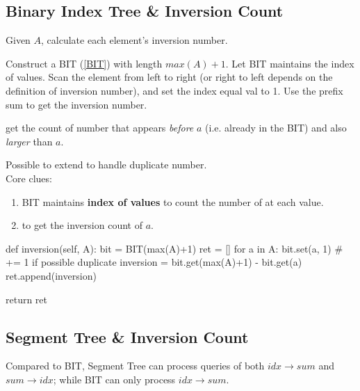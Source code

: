 \subsection{Binary Index Tree \& Inversion Count}
Given $A$, calculate each element's inversion number. 

Construct a BIT (\ref{BIT}) with length $max(A)+1$. Let BIT maintains the index of values. Scan the element from left to right (or right to left depends on the definition of inversion number), and set the index equal val to 1. Use the prefix sum to get the inversion number.

 get the count of number that appears \textit{before} $a$ (i.e. already in the BIT) and also \textit{larger} than $a$. 

Possible to extend to handle duplicate number. 
\\
Core clues:
\begin{enumerate}
\item BIT maintains \textbf{index of values} to count the number of at each value.
\item {} to get the inversion count of $a$.
\end{enumerate}
\begin{python}
def inversion(self, A):
    bit = BIT(max(A)+1)
    ret = []
    for a in A:
        bit.set(a, 1)  # += 1 if possible duplicate 
        inversion = bit.get(max(A)+1) - bit.get(a)
        ret.append(inversion)

    return ret
\end{python}

\subsection{Segment Tree \& Inversion Count}\label{segmentTreeInversionCount}
Compared to BIT, Segment Tree can process queries of both $idx \rightarrow sum$ and $sum \rightarrow idx$; while BIT can only process $idx \rightarrow sum$.

